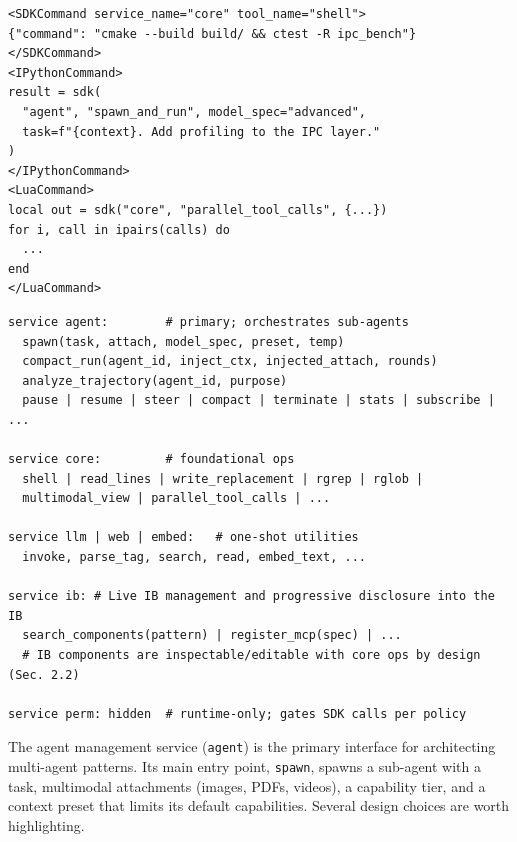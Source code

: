 \begin{listing}[t]
\begin{lstlisting}[morestring={[b]"},morecomment={[l]{--}},morekeywords={SDKCommand,IPythonCommand,LuaCommand,local,for,in,do,end},keywordstyle=\color{accentXML}\bfseries,stringstyle=\color{synString},commentstyle=\color{synComment}]
<SDKCommand service_name="core" tool_name="shell">
{"command": "cmake --build build/ && ctest -R ipc_bench"}
</SDKCommand>
<IPythonCommand>
result = sdk(
  "agent", "spawn_and_run", model_spec="advanced",
  task=f"{context}. Add profiling to the IPC layer."
)
</IPythonCommand>
<LuaCommand>
local out = sdk("core", "parallel_tool_calls", {...})
for i, call in ipairs(calls) do
  ...
end
</LuaCommand>
\end{lstlisting}
\caption{The three principal SDK execution command types.}
\label{lst:commands}
\end{listing}

\begin{listing}[t]
\begin{lstlisting}[morecomment={[l]{\#}},morekeywords={service,hidden},keywordstyle=\color{accentPython}\bfseries,commentstyle=\color{synComment}]
service agent:        # primary; orchestrates sub-agents
  spawn(task, attach, model_spec, preset, temp)
  compact_run(agent_id, inject_ctx, injected_attach, rounds)
  analyze_trajectory(agent_id, purpose)
  pause | resume | steer | compact | terminate | stats | subscribe | ...

service core:         # foundational ops
  shell | read_lines | write_replacement | rgrep | rglob |
  multimodal_view | parallel_tool_calls | ...

service llm | web | embed:   # one-shot utilities
  invoke, parse_tag, search, read, embed_text, ...

service ib: # Live IB management and progressive disclosure into the IB
  search_components(pattern) | register_mcp(spec) | ...
  # IB components are inspectable/editable with core ops by design (Sec. 2.2)

service perm: hidden  # runtime-only; gates SDK calls per policy
\end{lstlisting}
\caption{The built-in SDK services agents see by default. \texttt{perm} is hidden from the agent's call surface. Custom services (MCPs, IB libraries, skills) register explicitly (external APIs) or implicitly (with filesystem writes).}
\label{lst:toolkit}
\end{listing}

The agent management service (\texttt{agent}) is the primary interface for architecting multi-agent patterns. Its main entry point, \texttt{spawn}, spawns a sub-agent with a task, multimodal attachments (images, PDFs, videos), a capability tier, and a context preset that limits its default capabilities. Several design choices are worth highlighting.

